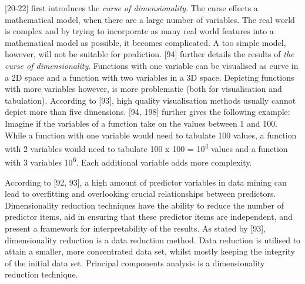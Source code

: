 \textcite{bellman1957dynamic}[20-22] first introduces the \textit{curse of dimensionality}. The curse effects a mathematical model, when there are a large number of variables. The real world is complex and by trying to incorporate as many real world features into a mathematical model as possible, it becomes complicated. A too simple model, however, will not be suitable for prediction. 
\textcite{bellman1961adaptive}[94] further details the results of \textit{the curse of dimensionality}. Functions with one variable can be visualised as curve in a 2D space and a function with two variables in a 3D space. Depicting functions with more variables however, is more problematic (both for visualisation and tabulation). According to \textcite{DataMiningAndPredictiveAnalytics}[93], high quality visualisation methods usually cannot depict more than five dimensions.
\textcite{bellman1961adaptive}[94, 198] further gives the following example: Imagine if the variables of a function take on the values between 1 and 100. While a function with one variable would need to tabulate 100 values, a function with 2 variables would need to tabulate 100 x 100 = 10\textsuperscript{4} values and a function with 3 variables 10\textsuperscript{6}. Each additional variable adds more complexity.






According to \textcite{DataMiningAndPredictiveAnalytics}[92, 93], a high amount of predictor variables in data mining can lead to overfitting and overlooking crucial relationships between predictors. Dimensionality reduction techniques have the ability to reduce the number of predictor items, aid in ensuring that these predictor items are independent, and present a framework for interpretability of the results.
As stated by \textcite{han2011data}[93], dimensionality reduction is a data reduction method. Data reduction is utilised to attain a smaller, more concentrated data set, whilst mostly keeping the integrity of the initial data set. Principal components analysis is a dimensionality reduction technique.

